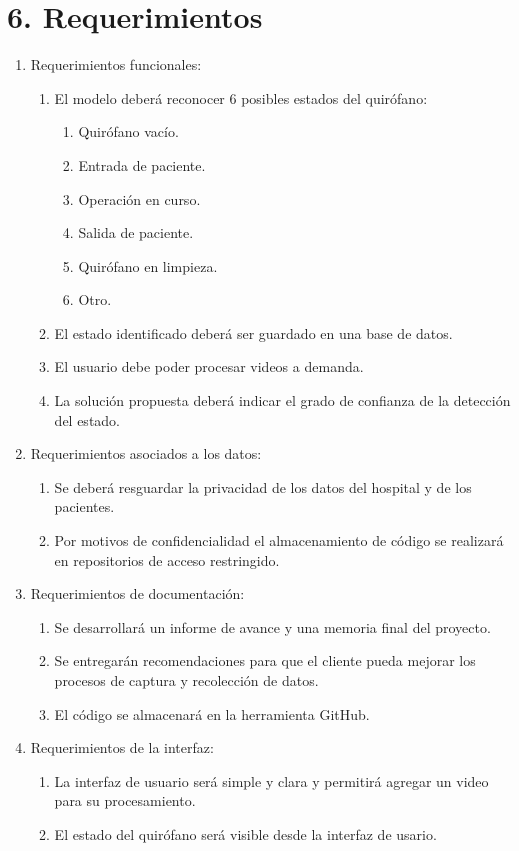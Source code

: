 \documentclass[
11pt, %
]{charter}
\begin{document}
\section{6. Requerimientos}
\label{sec:requerimientos}

\begin{enumerate}
	\item Requerimientos funcionales:
		\begin{enumerate}
			\item El modelo deberá reconocer 6 posibles estados del quirófano:
					\begin{enumerate}
						\item Quirófano vacío.
						\item Entrada de paciente.
						\item Operación en curso.
						\item Salida de paciente.
						\item Quirófano en limpieza.
						\item Otro.
					\end{enumerate}
			\item El estado identificado deberá ser guardado en una base de datos.
			\item El usuario debe poder procesar videos a demanda.
			\item La solución propuesta deberá indicar el grado de confianza de la detección del estado.
		\end{enumerate}
	\item Requerimientos asociados a los datos:
		\begin{enumerate}
			\item Se deberá resguardar la privacidad de los datos del hospital y de los pacientes.
			\item Por motivos de confidencialidad el almacenamiento de código se realizará en repositorios de acceso restringido.
		\end{enumerate}
	\item Requerimientos de documentación:
		\begin{enumerate}
		  \item Se desarrollará un informe de avance y una memoria final del proyecto.
		  \item Se entregarán recomendaciones para que el cliente pueda mejorar los procesos
		  de captura y recolección de datos.
		  \item El código se almacenará en la herramienta GitHub.
	    \end{enumerate}
	\item Requerimientos de la interfaz:
		\begin{enumerate}
		\item La interfaz de usuario será simple y clara y permitirá agregar un video para su procesamiento.
		\item El estado del quirófano será visible desde la interfaz de usario.
		\end{enumerate}	
\end{enumerate}
\end{document}
